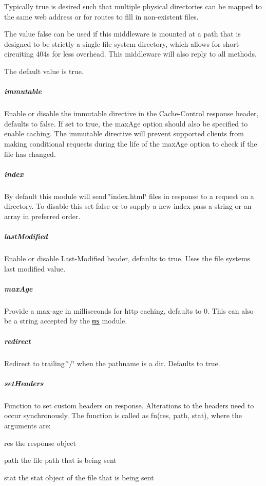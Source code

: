 Typically {\ttfamily true} is desired such that multiple physical directories can be mapped to the same web address or for routes to fill in non-\/existent files.

The value {\ttfamily false} can be used if this middleware is mounted at a path that is designed to be strictly a single file system directory, which allows for short-\/circuiting 404s for less overhead. This middleware will also reply to all methods.

The default value is {\ttfamily true}.

\subparagraph*{immutable}

Enable or disable the {\ttfamily immutable} directive in the {\ttfamily Cache-\/\+Control} response header, defaults to {\ttfamily false}. If set to {\ttfamily true}, the {\ttfamily max\+Age} option should also be specified to enable caching. The {\ttfamily immutable} directive will prevent supported clients from making conditional requests during the life of the {\ttfamily max\+Age} option to check if the file has changed.

\subparagraph*{index}

By default this module will send \char`\"{}index.\+html\char`\"{} files in response to a request on a directory. To disable this set {\ttfamily false} or to supply a new index pass a string or an array in preferred order.

\subparagraph*{last\+Modified}

Enable or disable {\ttfamily Last-\/\+Modified} header, defaults to true. Uses the file system\textquotesingle{}s last modified value.

\subparagraph*{max\+Age}

Provide a max-\/age in milliseconds for http caching, defaults to 0. This can also be a string accepted by the \href{https://www.npmjs.org/package/ms#readme}{\tt ms} module.

\subparagraph*{redirect}

Redirect to trailing \char`\"{}/\char`\"{} when the pathname is a dir. Defaults to {\ttfamily true}.

\subparagraph*{set\+Headers}

Function to set custom headers on response. Alterations to the headers need to occur synchronously. The function is called as {\ttfamily fn(res, path, stat)}, where the arguments are\+:


\begin{DoxyItemize}
\item {\ttfamily res} the response object
\item {\ttfamily path} the file path that is being sent
\item {\ttfamily stat} the stat object of the file that is being sent
\end{DoxyItemize}

